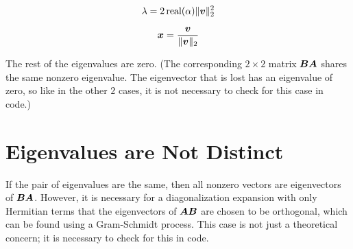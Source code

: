 \begin{appendices}
\begin{equation}
\lambda = 2\operatorname{real}(\alpha) \|\bm{v}\|_2^2
\end{equation}

\begin{equation}
\bm{x} = \frac{\bm{v}}{\|\bm{v}\|_2}
\end{equation}

The rest of the eigenvalues are zero.  (The corresponding $2 \times 2$ matrix $\bm{B}\bm{A}$ shares the same nonzero eigenvalue. The eigenvector that is lost has an eigenvalue of zero, so like in the other $2$ cases, it is not necessary to check for this case in code.)

\section{Eigenvalues are Not Distinct}

If the pair of eigenvalues are the same, then all nonzero vectors are eigenvectors of $\bm{B}\bm{A}$. However, it is necessary for a diagonalization expansion with only Hermitian terms that the eigenvectors of $\bm{A}\bm{B}$ are chosen to be orthogonal, which can be found using a Gram-Schmidt process. This case is not just a theoretical concern; it is necessary to check for this in code.

\end{appendices}
